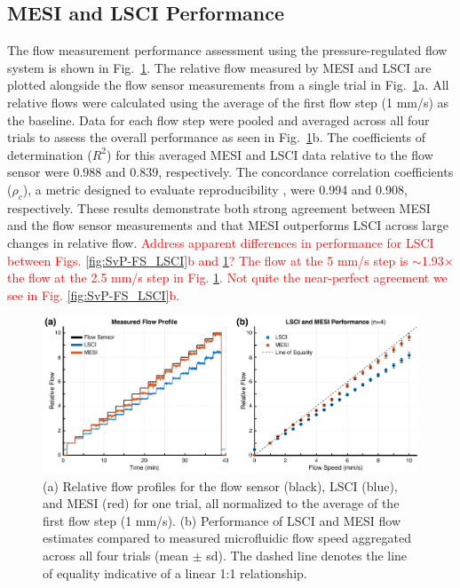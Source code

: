\documentclass[12pt]{spieman}
\begin{document}
\begin{spacing}{2}
\subsection{MESI and LSCI Performance}

The flow measurement performance assessment using the pressure-regulated flow system is shown in Fig.~\ref{fig:flow_mesi_lsci}. The relative flow measured by MESI and LSCI are plotted alongside the flow sensor measurements from a single trial in Fig.~\ref{fig:flow_mesi_lsci}a. All relative flows were calculated using the average of the first flow step (1 mm/s) as the baseline. Data for each flow step were pooled and averaged across all four trials to assess the overall performance as seen in Fig.~\ref{fig:flow_mesi_lsci}b. The coefficients of determination ($R^2$) for this averaged MESI and LSCI data relative to the flow sensor were 0.988 and 0.839, respectively. The concordance correlation coefficients ($\rho_c$), a metric designed to evaluate reproducibility \cite{Lin.1989}, were 0.994 and 0.908, respectively. These results demonstrate both strong agreement between MESI and the flow sensor measurements and that MESI outperforms LSCI across large changes in relative flow. \textcolor{red}{Address apparent differences in performance for LSCI between Figs. \ref{fig:SvP-FS_LSCI}b and \ref{fig:flow_mesi_lsci}? The flow at the 5 mm/s step is $\sim$1.93$\times$ the flow at the 2.5 mm/s step in Fig. \ref{fig:flow_mesi_lsci}. Not quite the near-perfect agreement we see in Fig. \ref{fig:SvP-FS_LSCI}b.}

\begin{figure}
    \includegraphics[width=\textwidth]{Figure6.pdf}
    \caption {
        (a) Relative flow profiles for the flow sensor (black), LSCI (blue), and MESI (red) for one trial, all normalized to the average of the first flow step (1 mm/s). (b) Performance of LSCI and MESI flow estimates compared to measured microfluidic flow speed aggregated across all four trials (mean $\pm$ sd). The dashed line denotes the line of equality indicative of a linear 1:1 relationship.
    }
    \label{fig:flow_mesi_lsci}
\end{figure}


\end{spacing}
\end{document}
